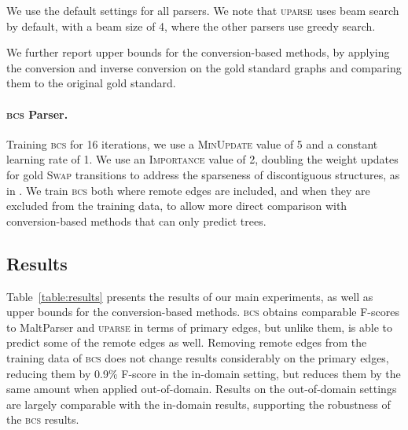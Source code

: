\documentclass[11pt]{article}
\newcommand{\tabref}[1]{Table~\ref{#1}}
\begin{document}
We use the default settings for all parsers.
We note that \textsc{uparse} uses beam search by default,
with a beam size of 4, where the other parsers use greedy search.




We further report upper bounds for the conversion-based methods, by applying
the conversion and inverse conversion on the gold standard graphs and comparing
them to the original gold standard.

\paragraph{\textsc{bcs} Parser.}
Training \textsc{bcs} for 16 iterations, we use a \textsc{MinUpdate} value of 5 and a constant learning rate of 1.
We use an \textsc{Importance} value of 2, doubling the weight updates
for gold \textsc{Swap} transitions to address the sparseness
of discontiguous structures, as in \cite{maier2015discontinuous}.
We train \textsc{bcs} both where remote edges
are included, and when they are excluded from the training data, to allow
more direct comparison with conversion-based methods that can only
predict trees.

\subsection{Results}

\tabref{table:results} presents the results of our main experiments, as well as
upper bounds for the conversion-based methods.
\textsc{bcs} obtains comparable F-scores to MaltParser and \textsc{uparse}
in terms of primary edges, but unlike them, is able to predict some
of the remote edges as well. 
Removing remote edges from the training data of \textsc{bcs} does not
change results considerably on the primary edges,
reducing them by 0.9\% F-score in the in-domain setting, but reduces
them by the same amount when applied out-of-domain. Results on
the out-of-domain settings are largely comparable with the in-domain
results, supporting the robustness of the \textsc{bcs} results.
\end{document}
